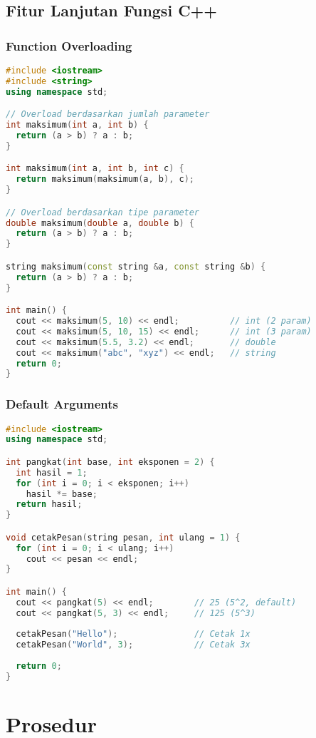 \documentclass[../main.tex]{subfiles}
\begin{document}
\subsection{Fitur Lanjutan Fungsi C++}
\subsubsection{Function Overloading}
\begin{lstlisting}[language=C++, caption={Overloading fungsi}]
#include <iostream>
#include <string>
using namespace std;

// Overload berdasarkan jumlah parameter
int maksimum(int a, int b) {
  return (a > b) ? a : b;
}

int maksimum(int a, int b, int c) {
  return maksimum(maksimum(a, b), c);
}

// Overload berdasarkan tipe parameter
double maksimum(double a, double b) {
  return (a > b) ? a : b;
}

string maksimum(const string &a, const string &b) {
  return (a > b) ? a : b;
}

int main() {
  cout << maksimum(5, 10) << endl;          // int (2 param)
  cout << maksimum(5, 10, 15) << endl;      // int (3 param)
  cout << maksimum(5.5, 3.2) << endl;       // double
  cout << maksimum("abc", "xyz") << endl;   // string
  return 0;
}
\end{lstlisting}

\subsubsection{Default Arguments}
\begin{lstlisting}[language=C++, caption={Default argument}]
#include <iostream>
using namespace std;

int pangkat(int base, int eksponen = 2) {
  int hasil = 1;
  for (int i = 0; i < eksponen; i++)
    hasil *= base;
  return hasil;
}

void cetakPesan(string pesan, int ulang = 1) {
  for (int i = 0; i < ulang; i++)
    cout << pesan << endl;
}

int main() {
  cout << pangkat(5) << endl;        // 25 (5^2, default)
  cout << pangkat(5, 3) << endl;     // 125 (5^3)
  
  cetakPesan("Hello");               // Cetak 1x
  cetakPesan("World", 3);            // Cetak 3x
  
  return 0;
}
\end{lstlisting}

\section{Prosedur}
\end{document}
